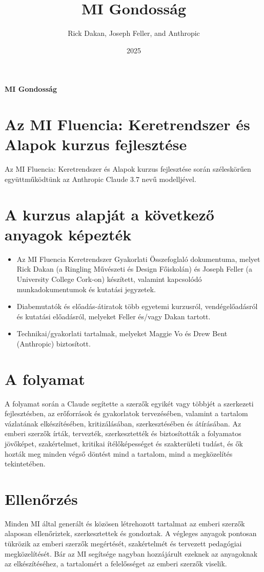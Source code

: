 \documentclass[a4paper, 11pt]{article}
\renewcommand{\maketitle}{
  \begin{center}
    {\fontsize{22}{26}\bfseries\color{primary}MI Gondosság}
    \vspace{0.5em}
    {\color{lightgray}\titlerule[3pt]}
    \vspace{1.5em}
  \end{center}
}
\begin{document}
\title{MI Gondosság}
\author{Rick Dakan, Joseph Feller, and Anthropic}
\date{2025}
\maketitle

\section*{Az MI Fluencia: Keretrendszer és Alapok kurzus fejlesztése}
Az MI Fluencia: Keretrendszer és Alapok kurzus fejlesztése során széleskörűen együttműködtünk az Anthropic Claude 3.7 nevű modelljével.

\section*{A kurzus alapját a következő anyagok képezték}
\begin{itemize}
    \item Az MI Fluencia Keretrendszer Gyakorlati Összefoglaló dokumentuma, melyet Rick Dakan (a Ringling Művészeti és Design Főiskolán) és Joseph Feller (a University College Cork-on) készített, valamint kapcsolódó munkadokumentumok és kutatási jegyzetek.
    \item Diabemutatók és előadás-átiratok több egyetemi kurzusról, vendégelőadásról és kutatási előadásról, melyeket Feller és/vagy Dakan tartott.
    \item Technikai/gyakorlati tartalmak, melyeket Maggie Vo és Drew Bent (Anthropic) biztosított.
\end{itemize}

\section*{A folyamat}
A folyamat során a Claude segítette a szerzők egyikét vagy többjét a szerkezeti fejlesztésben, az erőforrások és gyakorlatok tervezésében, valamint a tartalom vázlatának elkészítésében, kritizálásában, szerkesztésében és átírásában. Az emberi szerzők írták, tervezték, szerkesztették és biztosították a folyamatos jövőképet, szakértelmet, kritikai ítélőképességet és szakterületi tudást, és ők hozták meg minden végső döntést mind a tartalom, mind a megközelítés tekintetében.

\section*{Ellenőrzés}
Minden MI által generált és közösen létrehozott tartalmat az emberi szerzők alaposan ellenőriztek, szerkesztettek és gondoztak. A végleges anyagok pontosan tükrözik az emberi szerzők megértését, szakértelmét és tervezett pedagógiai megközelítését. Bár az MI segítsége nagyban hozzájárult ezeknek az anyagoknak az elkészítéséhez, a tartalomért a felelősséget az emberi szerzők viselik.
\end{document}
